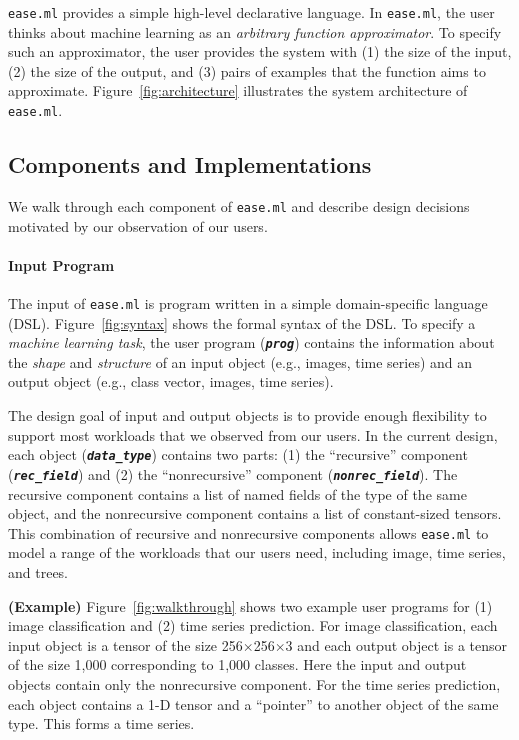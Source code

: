 \documentclass[letterpaper]{vldb}
\newcommand{\eml}{\texttt{ease.ml}\xspace}
\begin{document}
\eml provides a simple high-level declarative language.
In \eml, the user thinks about machine learning as an {\em arbitrary function approximator}.
To specify such an approximator, the user provides the
system with (1) the size of the input, (2) the size of the output,
and (3) pairs of examples that the function aims to approximate.
Figure~\ref{fig:architecture} illustrates the system architecture of \eml.

\vspace{-0.5em}
\subsection{Components and Implementations}

We walk through each component of \eml and 
describe design decisions
motivated by our observation of our users. 

\vspace{-1em}
\paragraph*{Input Program} The input
of \eml is program written in 
a simple domain-specific language (DSL). Figure~\ref{fig:syntax}
shows the formal syntax of the DSL. To specify
a {\em machine learning task}, the user program (\textbf{\texttt{\em prog}})
contains the information about the {\em shape}
and {\em structure} of an input object (e.g., images, time series)
and an output object (e.g., class vector, images, time series).

The design goal of input and output
objects is to provide enough flexibility to support most
workloads that we observed from our users. In the current design,
each object (\textbf{\texttt{\em data\_type}}) contains two parts:
(1) the ``recursive'' component (\textbf{\texttt{\em rec\_field}})
and (2) the ``nonrecursive'' component (\textbf{\texttt{\em nonrec\_field}}).
The recursive component contains a list of named 
fields of the type of the same object, and the nonrecursive
component contains a list of constant-sized tensors.
This combination of recursive and nonrecursive
components allows \eml to model a range of the workloads that our users need, including image, time series, and trees.

\vspace{0.5em}
\noindent
{\bf (Example)} Figure~\ref{fig:walkthrough} shows
two example user programs for (1) image classification and (2) time series
prediction. For image classification, each input
object is a tensor of the size 256$\times$256$\times$3 and
each output object is a tensor of the size 1,000 corresponding
to 1,000 classes. Here the input
and output objects contain only the nonrecursive component.
For the time series prediction, each object 
contains a 1-D tensor and 
a ``pointer'' to another object of the same type. This
forms a time series. 
\end{document}
